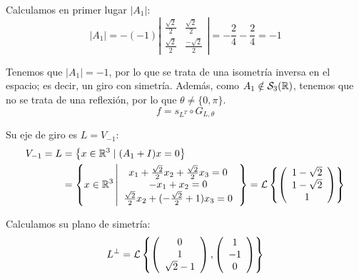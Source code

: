 \begin{ejercicio}
\begin{enumerate}
        Calculamos en primer lugar $|A_1|$:
        \begin{equation*}
            |A_1| = -(-1) \left|\begin{array}{cc}
            \frac{\sqrt{2}}{2} & \frac{\sqrt{2}}{2} \\
            \frac{\sqrt{2}}{2} & \frac{-\sqrt{2}}{2}
        \end{array}\right| = -\frac{2}{4} -\frac{2}{4} = -1
        \end{equation*}

        Tenemos que $|A_1|=-1$, por lo que se trata de una isometría inversa en el espacio; es decir, un giro con simetría. Además, como $A_1\notin \mathcal{S}_3(\mathbb{R})$, tenemos que no se trata de una reflexión, por lo que $\theta\neq \{0,\pi\}$.
        \begin{equation*}
            f=s_{L^T} \circ G_{L,\theta}
        \end{equation*}

        Su eje de giro es $L=V_{-1}$:
        \begin{equation*}
            \begin{split}
                V_{-1}=L& = \left\{x\in \mathbb{R}^3 \mid (A_1+I)x=0\right\}\\
                & = \left\{x\in \mathbb{R}^3 \left|
                \begin{array}{c}
                    x_1 +\frac{\sqrt{2}}{2}x_2 +\frac{\sqrt{2}}{2}x_3 =0 \\
                    -x_1+x_2=0 \\
                    \frac{\sqrt{2}}{2} x_2 +(-\frac{\sqrt{2}}{2}+1)x_3=0
                \end{array}
                \right.\right\}
                = \mathcal{L}\left\{\left(\begin{array}{c}
                     1-\sqrt{2} \\ 1-\sqrt{2} \\ 1
                \end{array}\right)\right\}
            \end{split}
        \end{equation*}

        Calculamos su plano de simetría:
        \begin{equation*}
            L^\perp = \mathcal{L}\left\{\left(\begin{array}{c}
                     0 \\ 1 \\ \sqrt{2}-1
                \end{array}\right),
                \left(\begin{array}{c}
                     1 \\ -1 \\ 0
                \end{array}\right)\right\}
        \end{equation*}


\end{enumerate}
\end{ejercicio}
